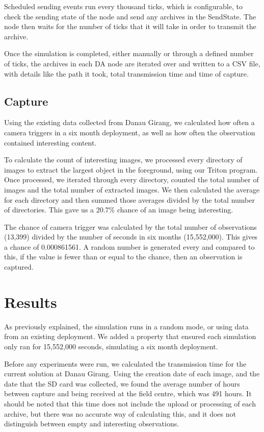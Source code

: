 	Scheduled sending events run every thousand ticks, which is configurable, to check the sending state of the node and send any archives in the SendState. The node then waits for the number of ticks that it will take in order to transmit the archive.
	
	Once the simulation is completed, either manually or through a defined number of ticks, the archives in each DA node are iterated over and written to a CSV file, with details like the path it took, total transmission time and time of capture.
	
\subsection{Capture}
	Using the existing data collected from Danau Girang, we calculated how often a camera triggers in a six month deployment, as well as how often the observation contained interesting content. 
	
	To calculate the count of interesting images, we processed every directory of images to extract the largest object in the foreground, using our Triton program. Once processed, we iterated through every directory, counted the total number of images and the total number of extracted images. We then calculated the average for each directory and then summed those averages divided by the total number of directories. This gave us a 20.7\% chance of an image being interesting.
	
	The chance of camera trigger was calculated by the total number of observations (13,399) divided by the number of seconds in six months (15,552,000). This gives a chance of 0.000861561. A random number is generated every and compared to this, if the value is fewer than or equal to the chance, then an observation is captured.

\section{Results}
	As previously explained, the simulation runs in a random mode, or using data from an existing deployment. We added a property that ensured each simulation only ran for 15,552,000 seconds, simulating a six month deployment.
	
	Before any experiments were run, we calculated the transmission time for the current solution at Danau Girang. Using the creation date of each image, and the date that the SD card was collected, we found the average number of hours between capture and being received at the field centre, which was 491 hours. It should be noted that this time does not include the upload or processing of each archive, but there was no accurate way of calculating this, and it does not distinguish between empty and interesting observations.
	
